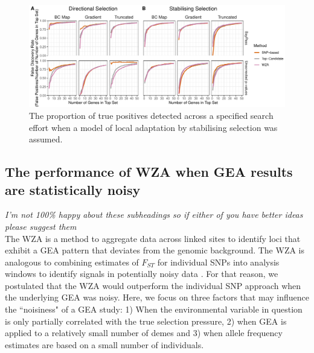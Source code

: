 \documentclass[10pt,twoside,lineno]{GSA_format}
\begin{document}
\begin{figure}
  \includegraphics[width=\linewidth]{Plots/UncorrectedBayPassComparison_FalsePositives.pdf} 
  \caption{The proportion of true positives detected across a specified search effort when a model of local adaptation  by stabilising selection was assumed.}

  \label{fig:falseDiscovery}
\end{figure}



\subsection{The performance of WZA when GEA results are statistically noisy}
\textit{I'm not 100\% happy about these subheadings so if either of you have better ideas please suggest them}\\

The WZA is a method to aggregate data across linked sites to identify loci that exhibit a GEA pattern that deviates from the genomic background. The WZA is analogous to combining estimates of $F_{ST}$ for individual SNPs into analysis windows to identify signals in potentially noisy data \citep{Hoban2016}. For that reason, we postulated that the WZA would outperform the individual SNP approach when the underlying GEA was noisy. Here, we focus on three factors that may influence the ``noisiness" of a GEA study: 1) When the environmental variable in question is only partially correlated with the true selection pressure, 2) when GEA is applied to a relatively small number of demes and 3) when allele frequency estimates are based on a small number of individuals. \\
\end{document}
